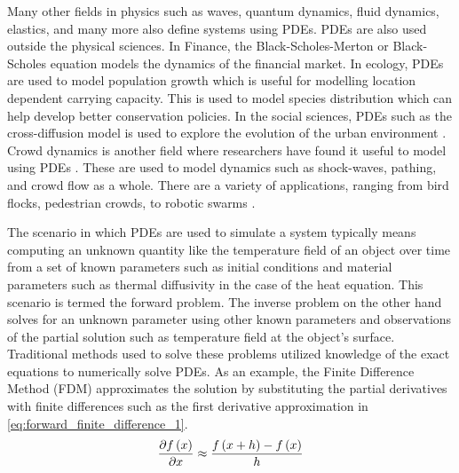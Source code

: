 Many other fields in physics such as waves, quantum dynamics, fluid dynamics, elastics, and many more also define systems using PDEs. PDEs are also used outside the physical sciences. In Finance, the Black-Scholes-Merton or Black-Scholes equation models the dynamics of the financial market. In ecology, PDEs are used to model population growth which is useful for modelling location dependent carrying capacity. This is used to model species distribution which can help develop better conservation policies. In the social sciences, PDEs such as the cross-diffusion model is used to explore the evolution of the urban environment \autocite{jinDetectingInteractionUrban2023}. Crowd dynamics is another field where researchers have found it useful to model using PDEs \autocite{mukherjeeLagrangianApproachModeling2015,hughesFlowLargeCrowds2000}. These are used to model dynamics such as shock-waves, pathing, and crowd flow as a whole. There are a variety of applications, ranging from bird flocks, pedestrian crowds, to robotic swarms \autocite{gongCrowdDynamicsModeling2023}.

The scenario in which PDEs are used to simulate a system typically means computing an unknown quantity like the temperature field of an object over time from a set of known parameters such as initial conditions and material parameters such as thermal diffusivity in the case of the heat equation. This scenario is termed the forward problem. The inverse problem on the other hand solves for an unknown parameter using other known parameters and observations of the partial solution such as temperature field at the object's surface. Traditional methods used to solve these problems utilized knowledge of the exact equations to numerically solve PDEs. As an example, the Finite Difference Method (FDM) approximates the solution by substituting the partial derivatives with finite differences such as the first derivative approximation in \cref{eq:forward_finite_difference_1}.
\begin{equation} \label{eq:forward_finite_difference_1}
    \pdv{f\left(x\right)}{x} \approx \frac{f\left(x+h\right)-f\left(x\right)}{h}
\end{equation}

